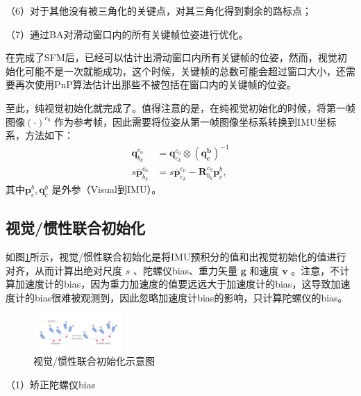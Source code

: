 （6）对于其他没有被三角化的关键点，对其三角化得到剩余的路标点；

（7）通过BA对滑动窗口内的所有关键帧位姿进行优化。

在完成了SFM后，已经可以估计出滑动窗口内所有关键帧的位姿，然而，视觉初始化可能不是一次就能成功，这个时候，关键帧的总数可能会超过窗口大小，还需要再次使用PnP算法估计出那些不被包括在窗口内的关键帧的位姿。

至此，纯视觉初始化就完成了。值得注意的是，在纯视觉初始化的时候，将第一帧图像$ {(\cdot)}^{c_0} $ 作为参考帧，因此需要将位姿从第一帧图像坐标系转换到IMU坐标系，方法如下：
\begin{equation}
\label{eqn:3.83}
\begin{split}
\mathbf{q}_{b_k}^{c_0}&=\mathbf{q}_{c_k}^{c_0}\otimes(\mathbf{q_c^b})^{-1} \\
s\bar{\mathbf{p}}_{b_k}^{c_0}&=s\bar{\mathbf{p}}_{c_k}^{c_0}-\mathbf{R}_{b_k}^{c_0}\mathbf{p}_c^b,
\end{split}
\end{equation}
其中$ \mathbf{p}_c^b,\mathbf{q}_c^b $ 是外参（Visual到IMU）。
\subsection{视觉/惯性联合初始化}
如图\ref{fig3_12}所示，视觉/惯性联合初始化是将IMU预积分的值和出视觉初始化的值进行对齐，从而计算出绝对尺度 $s $ 、陀螺仪bias、重力矢量 $\mathbf{g} $ 和速度 $\mathbf{v}$ 。注意，不计算加速度计的bias，因为重力加速度的值要远远大于加速度计的bias，这导致加速度计的bias很难被观测到，因此忽略加速度计bias的影响，只计算陀螺仪的bias。
\begin{figure}[h]\setlength{\belowcaptionskip}{-12pt}
	\centering
	\includegraphics[width=0.3\textwidth, angle=-90]{figures/chapter3/fig3_12}
	\caption{视觉/惯性联合初始化示意图}\label{fig3_12}
\end{figure}

（1）矫正陀螺仪bias

